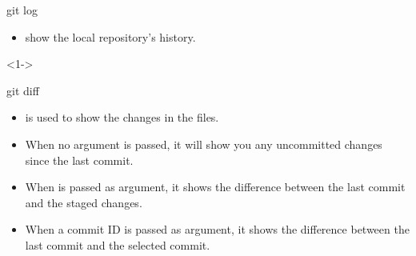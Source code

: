 \begin{frame}[fragile]{git log}
    \begin{itemize} 
        \item {} show the local repository's history. 
    \end{itemize}
    \begin{shellblock}<1->{
}\end{shellblock}
\end{frame}

\begin{frame}[fragile]{git diff}
    \begin{itemize} 
        \item {} is used to show the changes in the files.
        \item When no argument is passed, it will show you any uncommitted changes since the last commit.
        \item When  is passed as argument, it shows the difference between the last commit and the staged changes.
        \item When a commit ID is passed as argument, it shows the difference between the last commit and the selected commit.
    \end{itemize}      		       
\end{frame}
